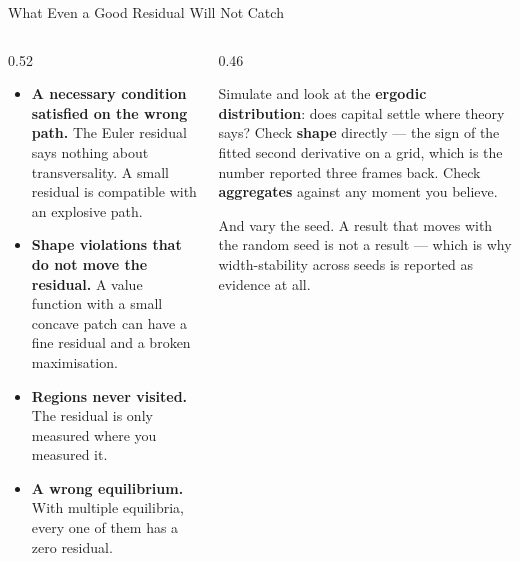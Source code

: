 \begin{frame}{What Even a Good Residual Will Not Catch}
\begin{columns}[T]
\begin{column}{0.52\textwidth}
\small
\begin{itemize}\small\setlength{\itemsep}{1.2mm}
  \item \textbf{A necessary condition satisfied on the wrong path.} The Euler residual says nothing about transversality. A small residual is compatible with an explosive path.
  \item \textbf{Shape violations that do not move the residual.} A value function with a small concave patch can have a fine residual and a broken maximisation.
  \item \textbf{Regions never visited.} The residual is only measured where you measured it.
  \item \textbf{A wrong equilibrium.} With multiple equilibria, every one of them has a zero residual.
\end{itemize}
\end{column}
\begin{column}{0.46\textwidth}
\begin{takeawaybox}[title=\textbf{So check the economics too}]\small
Simulate and look at the \textbf{ergodic distribution}: does capital settle where theory says?
\medskip
Check \textbf{shape} directly --- the sign of the fitted second derivative on a grid, which is the number reported three frames back.
\medskip
Check \textbf{aggregates} against any moment you believe.
\end{takeawaybox}
\medskip
\begin{cautionbox}\footnotesize
And vary the seed. A result that moves with the random seed is not a result --- which is why width-stability across seeds is reported as evidence at all.
\end{cautionbox}
\end{column}
\end{columns}
\vspace{1mm}
\end{frame}

